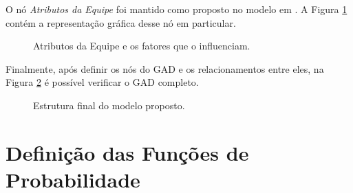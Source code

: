O nó \textit{Atributos da Equipe} foi mantido como proposto no modelo em \cite{freire}. A Figura \ref{modelo:gad:atributos} contém a representação gráfica desse nó em particular.

\begin{figure}[ht!]
\begin{center}
	\end{center}
	\caption{Atributos da Equipe e os fatores que o influenciam.}
	\label{modelo:gad:atributos}
\end{figure}

Finalmente, após definir os nós do GAD e os relacionamentos entre eles, na Figura \ref{modelo:gad:final} é possível verificar o GAD completo.

\begin{figure}[ht!]
\begin{center}
	\end{center}
	\caption{Estrutura final do modelo proposto.}
	\label{modelo:gad:final}
\end{figure}

\section{Definição das Funções de Probabilidade}
\label{modelo:funcoes}

